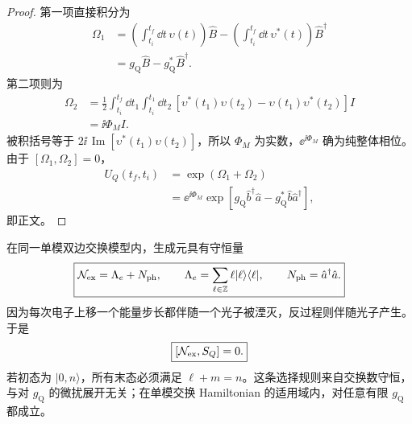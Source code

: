 \begin{proof}
第一项直接积分为
\begin{align*}
\Omega_1
&=\left(\int_{t_i}^{t_f}\dd t\,\upsilon(t)\right)\hat B
-\left(\int_{t_i}^{t_f}\dd t\,\upsilon^*(t)\right)\hat B^\dagger\\
&=g_{\mathrm Q}\hat B-g_{\mathrm Q}^*\hat B^\dagger.
\end{align*}
第二项则为
\begin{align*}
\Omega_2
&=\frac12\int_{t_i}^{t_f}\dd t_1
\int_{t_i}^{t_1}\dd t_2\,
[\upsilon^*(t_1)\upsilon(t_2)-\upsilon(t_1)\upsilon^*(t_2)]I\\
&=\ii\Phi_M I.
\end{align*}
被积括号等于 $2\ii\,\operatorname{Im}[\upsilon^*(t_1)\upsilon(t_2)]$，所以 $\Phi_M$ 为实数，$\ee^{\ii\Phi_M}$ 确为纯整体相位。由于 $[\Omega_1,\Omega_2]=0$，
\begin{align*}
U_Q(t_f,t_i)
&=\exp(\Omega_1+\Omega_2)\\
&=\ee^{\ii\Phi_M}
\exp[g_{\mathrm Q}\hat b^\dagger\hat a-g_{\mathrm Q}^*\hat b\hat a^\dagger],
\end{align*}
即正文。
\end{proof}


在同一单模双边交换模型内，生成元具有守恒量
\begin{equation}
\boxed{
\mathcal N_{\rm ex}=\Lambda_e+N_{\rm ph},
\qquad
\Lambda_e=\sum_{\ell\in\mathbb Z}\ell|\ell\rangle\langle\ell|,
\qquad
N_{\rm ph}=\hat a^\dagger\hat a.}
\label{eq:qpinem-exchange-number-dp68}
\end{equation}
因为每次电子上移一个能量步长都伴随一个光子被湮灭，反过程则伴随光子产生。于是
\begin{equation}
\boxed{[\mathcal N_{\rm ex},S_Q]=0.}
\label{eq:qpinem_conservation}
\end{equation}
若初态为 $|0,n\rangle$，所有末态必须满足 $\ell+m=n$。这条选择规则来自交换数守恒，与对 $g_{\mathrm Q}$ 的微扰展开无关；在单模交换 Hamiltonian 的适用域内，对任意有限 $g_{\mathrm Q}$ 都成立。

